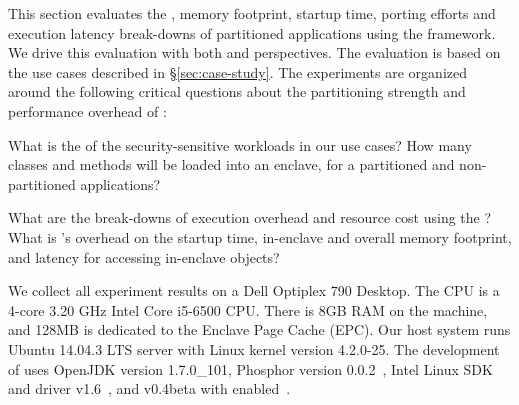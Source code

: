 \label{sec:eval}


This section evaluates the \tcbsize{}, memory footprint, startup time,
porting efforts and execution latency break-downs of partitioned applications using the \sysname{} framework.
We drive this evaluation 
with both \staticphase{} and \dynamicphase{} perspectives.
The evaluation is based on the use cases described in \S\ref{sec:case-study}.
The experiments are organized around
the following critical questions
about the partitioning strength and performance overhead of \sysname{}:
\begin{compactenum}
\item What is the \tcbsize{} of the security-sensitive workloads in our use cases? How many classes and methods will be loaded into an enclave, for a partitioned and non-partitioned applications?
\item What are the break-downs of execution overhead and resource cost using the \dynamicframework{}? What is \sysname{}'s overhead on the startup time, in-enclave and overall memory footprint, and latency for accessing in-enclave objects?
\end{compactenum}

We collect all experiment results on a
Dell Optiplex 790 Desktop.
The CPU is a 4-core 3.20 GHz Intel Core i5-6500 CPU. %
There is 8GB RAM on the machine, and 128MB is dedicated to the Enclave Page Cache (EPC).
Our host system runs Ubuntu 14.04.3 LTS server with Linux kernel version 4.2.0-25.
The development of \sysname{} uses 
OpenJDK version 1.7.0\_101,
Phosphor version 0.0.2~\cite{phosphor},
Intel \sgx{} Linux SDK~\cite{intel-sgx-linux} and driver v1.6~\cite{intel-sgx-linux-driver},
and \graphene{} v0.4beta with \sgx{} enabled~\cite{graphene-sgx}.


